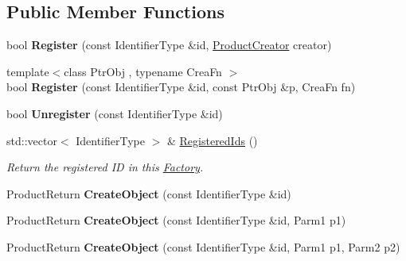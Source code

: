 \subsection*{Public Member Functions}
\begin{DoxyCompactItemize}
\item 
\hypertarget{classLoki_1_1CachedFactory_a036a0769dd53bfa95ff2f8068a696ee8}{}bool {\bfseries Register} (const Identifier\+Type \&id, \hyperlink{classLoki_1_1Functor}{Product\+Creator} creator)\label{classLoki_1_1CachedFactory_a036a0769dd53bfa95ff2f8068a696ee8}

\item 
\hypertarget{classLoki_1_1CachedFactory_ad70464954a8d24edc00958e8c457e735}{}{\footnotesize template$<$class Ptr\+Obj , typename Crea\+Fn $>$ }\\bool {\bfseries Register} (const Identifier\+Type \&id, const Ptr\+Obj \&p, Crea\+Fn fn)\label{classLoki_1_1CachedFactory_ad70464954a8d24edc00958e8c457e735}

\item 
\hypertarget{classLoki_1_1CachedFactory_a2f2313c2adb3e13784ab875c0017d8c4}{}bool {\bfseries Unregister} (const Identifier\+Type \&id)\label{classLoki_1_1CachedFactory_a2f2313c2adb3e13784ab875c0017d8c4}

\item 
\hypertarget{classLoki_1_1CachedFactory_abe003d4613debd4079cf26f5c13aabc6}{}std\+::vector$<$ Identifier\+Type $>$ \& \hyperlink{classLoki_1_1CachedFactory_abe003d4613debd4079cf26f5c13aabc6}{Registered\+Ids} ()\label{classLoki_1_1CachedFactory_abe003d4613debd4079cf26f5c13aabc6}

\begin{DoxyCompactList}\small\item\em Return the registered I\+D in this \hyperlink{classLoki_1_1Factory}{Factory}. \end{DoxyCompactList}\item 
\hypertarget{classLoki_1_1CachedFactory_ac9f1876442472a990aaa151f4c836299}{}Product\+Return {\bfseries Create\+Object} (const Identifier\+Type \&id)\label{classLoki_1_1CachedFactory_ac9f1876442472a990aaa151f4c836299}

\item 
\hypertarget{classLoki_1_1CachedFactory_abfeed016c71081340153b6d6a0f85986}{}Product\+Return {\bfseries Create\+Object} (const Identifier\+Type \&id, Parm1 p1)\label{classLoki_1_1CachedFactory_abfeed016c71081340153b6d6a0f85986}

\item 
\hypertarget{classLoki_1_1CachedFactory_a40d700079169e23e448e27340838ae24}{}Product\+Return {\bfseries Create\+Object} (const Identifier\+Type \&id, Parm1 p1, Parm2 p2)\label{classLoki_1_1CachedFactory_a40d700079169e23e448e27340838ae24}


\end{DoxyCompactItemize}
